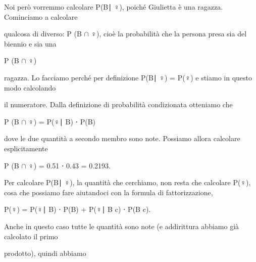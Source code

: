 \documentclass[a4paper,portrait,12pt]{article}
\begin{document}
\begin{flushleft}
Noi per\`{o} vorremmo calcolare P(B∣ ♀), poich\'{e} Giulietta \`{e} una ragazza. Cominciamo a calcolare
\end{flushleft}


\begin{flushleft}
qualcosa di diverso: P (B $\cap$ ♀), cio\`{e} la probabilit\`{a} che la persona presa sia del biennio e sia una
\end{flushleft}


\begin{flushleft}
P (B $\cap$ ♀)
\end{flushleft}


\begin{flushleft}
ragazza. Lo facciamo perch\'{e} per definizione P(B∣ ♀) = P(♀) e stiamo in questo modo calcolando
\end{flushleft}


\begin{flushleft}
il numeratore. Dalla definizione di probabilit\`{a} condizionata otteniamo che
\end{flushleft}


\begin{flushleft}
P (B $\cap$ ♀) = P(♀∣ B) ⋅ P(B)
\end{flushleft}


\begin{flushleft}
dove le due quantit\`{a} a secondo membro sono note. Possiamo allora calcolare esplicitamente
\end{flushleft}


\begin{flushleft}
P (B $\cap$ ♀) = 0.51 ⋅ 0.43 = 0.2193.
\end{flushleft}


\begin{flushleft}
Per calcolare P(B∣ ♀), la quantit\`{a} che cerchiamo, non resta che calcolare P(♀), cosa che possiamo fare aiutandoci con la formula di fattorizzazione,
\end{flushleft}


\begin{flushleft}
P(♀) = P(♀∣ B) ⋅ P(B) + P(♀∣ B c) ⋅ P(B c).
\end{flushleft}


\begin{flushleft}
Anche in questo caso tutte le quantit\`{a} sono note (e addirittura abbiamo gi\`{a} calcolato il primo
\end{flushleft}


\begin{flushleft}
prodotto), quindi abbiamo
\end{flushleft}
\end{document}
